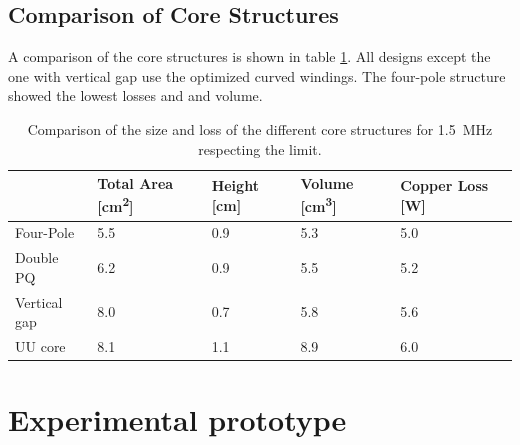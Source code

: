 \documentclass{IPEC2026}
\newcommand{\sbl}[1]{\glssymbol{#1}}
\begin{document}
\subsection{Comparison of Core Structures}
A comparison of the core structures is shown in table \ref{tab:InductorComparison}. All designs except the one with vertical gap use the optimized curved windings. The four-pole structure showed the lowest losses and and volume.
\begin{table}
  \centering
  \caption{Comparison of the size and loss of the different core structures for \qty{1.5}{\MHz} respecting the \sbl{Hdc} limit.}
    \begin{tabularx}{\columnwidth}{|l|X|X|X|X|}
      \hline
          & {Total Area [\unit{\cm\squared}]} & {Height [\unit{\cm}]} & {Volume [\unit{\cubic\cm}]} & {Copper Loss [\unit{\W}]} \\
      \hline
      \hline
      Four-Pole & 5.5 & 0.9 & 5.3 & 5.0 \\
      \hline
      Double PQ & 6.2 & 0.9 & 5.5 & 5.2 \\
      \hline
      Vertical gap & 8.0 & 0.7 & 5.8 & 5.6 \\
      \hline
      UU core & 8.1 & 1.1 & 8.9 & 6.0 \\
      \hline
    \end{tabularx}%
  \label{tab:InductorComparison}%
\end{table}%

\section{Experimental prototype}
\end{document}

